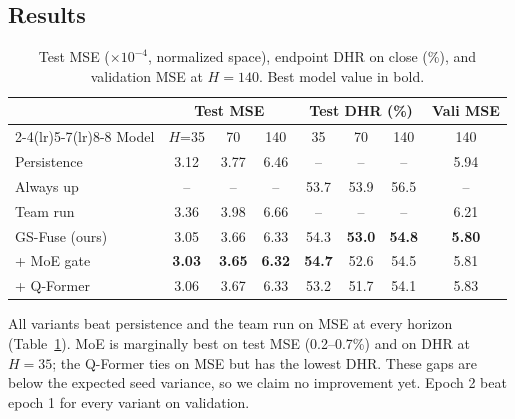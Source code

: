 \documentclass{article}
\begin{document}
\subsection{Results}
\begin{table}[t]
\caption{Test MSE ($\times10^{-4}$, normalized space), endpoint DHR on close (\%), and validation MSE at $H=140$. Best model value in bold.}
\label{tab:main}
\centering\small
\begin{tabular}{l ccc ccc c}
\toprule
& \multicolumn{3}{c}{Test MSE} & \multicolumn{3}{c}{Test DHR (\%)} & Vali MSE \\
\cmidrule(lr){2-4}\cmidrule(lr){5-7}\cmidrule(lr){8-8}
Model & $H$=35 & 70 & 140 & 35 & 70 & 140 & 140 \\
\midrule
Persistence & 3.12 & 3.77 & 6.46 & -- & -- & -- & 5.94 \\
Always up & -- & -- & -- & 53.7 & 53.9 & 56.5 & -- \\
Team run & 3.36 & 3.98 & 6.66 & -- & -- & -- & 6.21 \\
\midrule
GS-Fuse (ours) & 3.05 & 3.66 & 6.33 & 54.3 & \textbf{53.0} & \textbf{54.8} & \textbf{5.80} \\
+ MoE gate & \textbf{3.03} & \textbf{3.65} & \textbf{6.32} & \textbf{54.7} & 52.6 & 54.5 & 5.81 \\
+ Q-Former & 3.06 & 3.67 & 6.33 & 53.2 & 51.7 & 54.1 & 5.83 \\
\bottomrule
\end{tabular}
\end{table}
All variants beat persistence and the team run on MSE at every horizon (Table~\ref{tab:main}). MoE is marginally best on test MSE (0.2--0.7\%) and on DHR at $H=35$; the Q-Former ties on MSE but has the lowest DHR. These gaps are below the expected seed variance, so we claim no improvement yet. Epoch 2 beat epoch 1 for every variant on validation.
\end{document}
